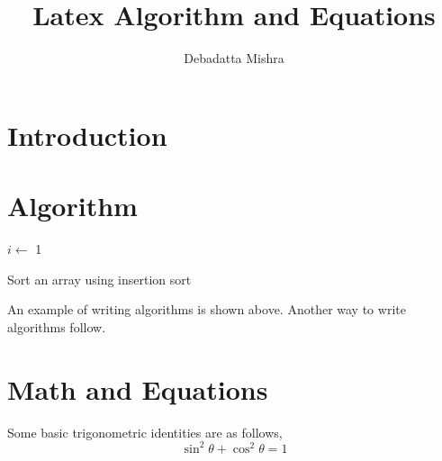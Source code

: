 \documentclass[a4paper, 10pt,twocolumn]{article}
\title{Latex Algorithm and Equations}
\author{Debadatta Mishra}
\date{}
\begin{document}
\maketitle
\begin{abstract}
\lipsum[15]
\end{abstract}    
\section{Introduction}
\lipsum
\section{Algorithm}

\begin{algorithm}
\SetAlgoLined
{}
$i \leftarrow$ 1 \;

\label{algo:ins_sort}
\caption{Sort an array using insertion sort}
\end{algorithm}

An example of writing algorithms is shown above.
Another way to write algorithms follow.


\section{Math and Equations}
Some basic trigonometric identities are as follows,
\begin{equation}
\sin^2\theta + \cos^2\theta = 1
\end{equation}
\end{document}
